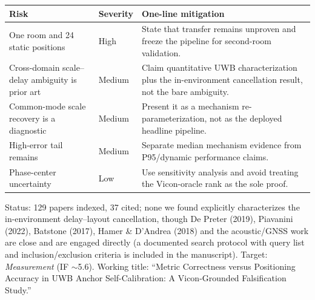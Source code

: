 \documentclass[10pt,a4paper]{article}
\begin{document}
\begin{center}
\scriptsize
\begin{tabularx}{\textwidth}{@{}>{\raggedright\arraybackslash}p{34mm}>{\raggedright\arraybackslash}p{19mm}>{\raggedright\arraybackslash}X@{}}
\toprule
Risk & Severity & One-line mitigation \\
\midrule
One room and 24 static positions & High & State that transfer remains unproven and freeze the pipeline for second-room validation. \\
Cross-domain scale--delay ambiguity is prior art & Medium & Claim quantitative UWB characterization plus the in-environment cancellation result, not the bare ambiguity. \\
Common-mode scale recovery is a diagnostic & Medium & Present it as a mechanism re-parameterization, not as the deployed headline pipeline. \\
High-error tail remains & Medium & Separate median mechanism evidence from P95/dynamic performance claims. \\
Phase-center uncertainty & Low & Use sensitivity analysis and avoid treating the Vicon-oracle rank as the sole proof. \\
\bottomrule
\end{tabularx}
\end{center}

Status: 129 papers indexed, 37 cited; none we found explicitly characterizes the in-environment delay--layout cancellation, though De Preter (2019), Piavanini (2022), Batstone (2017), Hamer \& D'Andrea (2018) and the acoustic/GNSS work are close and are engaged directly (a documented search protocol with query list and inclusion/exclusion criteria is included in the manuscript). Target: \emph{Measurement} (IF $\sim$5.6). Working title: ``Metric Correctness versus Positioning Accuracy in UWB Anchor Self-Calibration: A Vicon-Grounded Falsification Study.''
\end{document}
